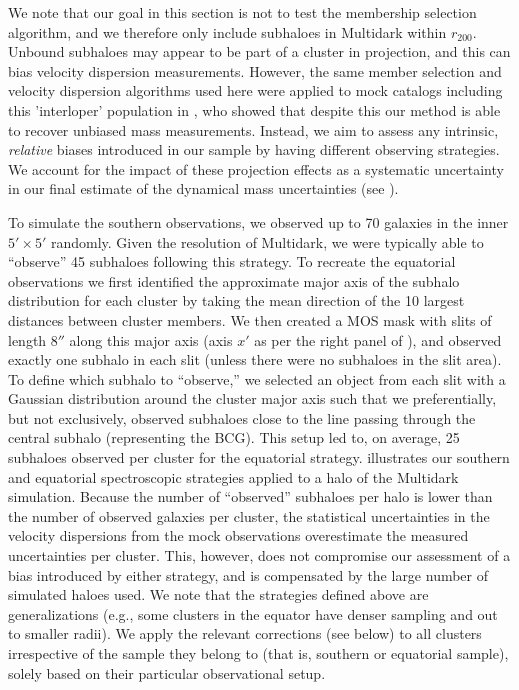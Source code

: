 We note that our goal in this section is not to test the membership selection algorithm, and we therefore only include subhaloes in Multidark within $r_{200}$. Unbound subhaloes may appear to be part of a cluster in projection, and this can bias velocity dispersion measurements. However, the same member selection and velocity dispersion algorithms used here were applied to mock catalogs including this 'interloper' population in \cite{old15}, who showed that despite this our method is able to recover unbiased mass measurements. Instead, we aim to assess any intrinsic, \emph{relative} biases introduced in our sample by having different observing strategies. We account for the impact of these projection effects as a systematic uncertainty in our final estimate of the dynamical mass uncertainties (see ).

To simulate the southern observations, we observed up to 70 galaxies in the inner 
$5'\times5'$ randomly. Given the resolution of Multidark, we were typically able to 
``observe'' 45 subhaloes following this strategy. To recreate the equatorial observations we first 
identified the approximate major axis of the subhalo distribution for each cluster by taking the 
mean direction of the 10 largest distances between cluster members. We then created a MOS mask 
with slits of length $8''$ along this major axis (axis $x'$ as per the right panel of 
), and observed exactly one subhalo in each slit (unless there were no 
subhaloes in the slit area). To define which subhalo to ``observe,'' we selected an object from 
each slit with a Gaussian distribution around the cluster major axis such that we preferentially, 
but not exclusively, observed subhaloes close to the line passing through the central subhalo 
(representing the BCG). This setup led to, on average, 25 subhaloes observed per cluster for the 
equatorial strategy.  illustrates our southern and equatorial spectroscopic 
strategies applied to a halo of the Multidark simulation. Because the number of ``observed'' 
subhaloes per halo is lower than the number of observed galaxies per cluster, the statistical 
uncertainties in the velocity dispersions from the mock observations overestimate the measured 
uncertainties per cluster. This, however, does not compromise our assessment of a bias introduced 
by either strategy, and is compensated by the large number of simulated haloes used. We note that 
the strategies defined above are generalizations (e.g., some clusters in the equator have denser 
sampling and out to smaller radii). We apply the relevant corrections (see below) to all clusters 
irrespective of the sample they belong to (that is, southern or equatorial sample), solely based 
on their particular observational setup.

